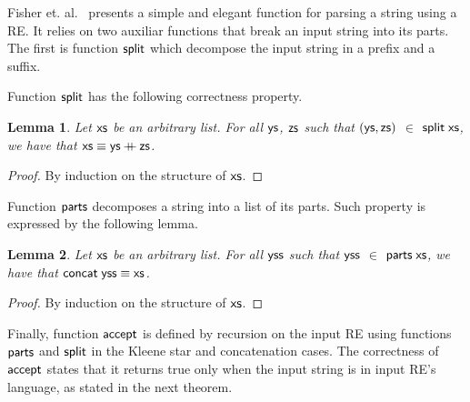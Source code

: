 \documentclass[sigplan]{acmart}
\newcommand{\plus}{\mathbin{+\!\!\!+}}
\def\resethooks{%
  \global\let\SaveRestoreHook\empty
  \global\let\ColumnHook\empty}
\let\hspre\empty
\let\hspost\empty
\newtheorem{Lemma}{Lemma}
\theoremstyle{definition}
\newcommand{\C}[1]{\red{\mathsf{#1}}}
\newcommand{\F}[1]{\green{\mathsf{#1}}}
\newcommand{\V}[1]{\black{\mathsf{#1}}}
\begin{document}
Fisher et. al.~\cite{Fischer2010} presents a simple and elegant function for parsing a string using a RE. It relies on two
auxiliar functions that break an input string into its parts. The first is function \ensuremath{\F{split}} which decompose the input string in
a prefix and a suffix.
\resethooks
Function \ensuremath{\F{split}} has the following correctness property.
\begin{Lemma}
 Let \ensuremath{\V{xs}} be an arbitrary list. For all \ensuremath{\V{ys}}, \ensuremath{\V{zs}} such that \ensuremath{(\V{ys},\V{zs})} $\in$ \ensuremath{\F{split}\;\V{xs}}, we have that \ensuremath{\V{xs}\equiv \V{ys}\plus \V{zs}}.
\end{Lemma}
\begin{proof}
   By induction on the structure of \ensuremath{\V{xs}}. 
\end{proof}
Function \ensuremath{\F{parts}} decomposes a string into a list of its parts. Such property is expressed by the following lemma.
\begin{Lemma}
Let \ensuremath{\V{xs}} be an arbitrary list. For all \ensuremath{\V{yss}} such that \ensuremath{\V{yss}} $\in$ \ensuremath{\F{parts}\;\V{xs}}, we have that \ensuremath{\F{concat}\;\V{yss}\equiv \V{xs}}.
\end{Lemma}
\begin{proof}
   By induction on the structure of \ensuremath{\V{xs}}.
\end{proof}
Finally, function \ensuremath{\F{accept}} is defined by recursion on the input RE using functions \ensuremath{\F{parts}} and \ensuremath{\F{split}} in the
Kleene star and concatenation cases. The correctness of \ensuremath{\F{accept}} states that it returns true only when the
input string is in input RE's language, as stated in the next theorem.
\end{document}
